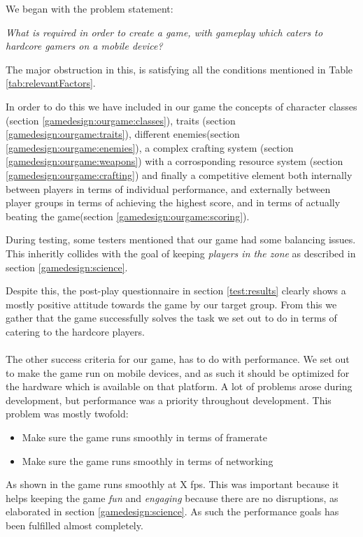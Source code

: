 We began with the problem statement:
\begin{center}
\textit{What is required in order to create a game, with gameplay which caters to hardcore gamers on a mobile device?}
\end{center}

The major obstruction in this, is satisfying all the conditions mentioned in Table \ref{tab:relevantFactors}.

In order to do this we have included in our game the concepts of character classes (section \ref{gamedesign:ourgame:classes}), traits (section \ref{gamedesign:ourgame:traits}), different enemies(section \ref{gamedesign:ourgame:enemies}), a complex crafting system (section \ref{gamedesign:ourgame:weapons}) with a corrosponding resource system (section \ref{gamedesign:ourgame:crafting}) and finally a competitive element both internally between players in terms of individual performance, and externally between player groups in terms of achieving the highest score, and in terms of actually beating the game(section \ref{gamedesign:ourgame:scoring}).

During testing, some testers mentioned that our game had some balancing issues. 
This inheritly collides with the goal of keeping \emph{players in the zone} as described in section \ref{gamedesign:science}. 

Despite this, the post-play questionnaire in section \ref{test:results} clearly shows a mostly positive attitude towards the game by our target group.
From this we gather that the game successfully solves the task we set out to do in terms of catering to the hardcore players.\\\\
The other success criteria for our game, has to do with performance. 
We set out to make the game run on mobile devices, and as such it should be optimized for the hardware which is available on that platform. 
A lot of problems arose during development, but performance was a priority throughout development. 
This problem was mostly twofold:

\begin{itemize}
\item Make sure the game runs smoothly in terms of framerate 
\item Make sure the game runs smoothly in terms of networking
\end{itemize}

As shown in  the game runs smoothly at X fps. 
This was important because it helps keeping the game \emph{fun} and \emph{engaging} because there are no disruptions, as elaborated in section \ref{gamedesign:science}.
As such the performance goals has been fulfilled almost completely.